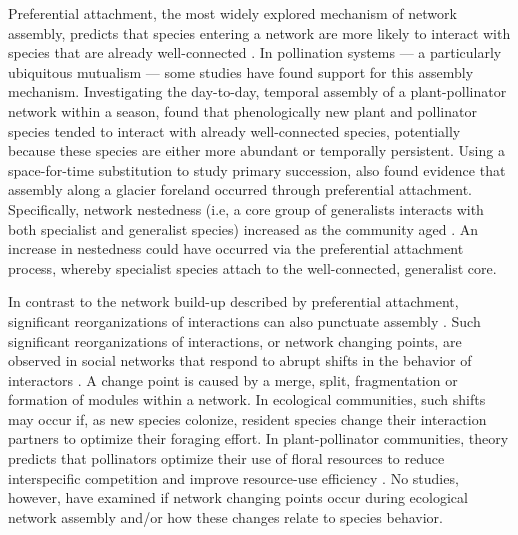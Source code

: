 \documentclass[12pt]{article}
\begin{document}

Preferential attachment, the most widely explored mechanism of network
assembly, predicts that species entering a network are more likely to
interact with species that are already well-connected \citep[the
``rich-get-richer'' principle,][]{barabasi1999emergence}. In
pollination systems --- a particularly ubiquitous mutualism
\citep{ollerton-2011-321, klein-2007-303} --- some studies have found
support for this assembly mechanism. Investigating the day-to-day,
temporal assembly of a plant-pollinator network within a season,
\cite{Olesen2008} found that phenologically new plant and pollinator
species tended to interact with already well-connected species,
potentially because these species are either more abundant or
temporally persistent. Using a space-for-time substitution to study
primary succession, \cite{albrecht2010plant} also found evidence that
assembly along a glacier foreland occurred through preferential
attachment. Specifically, network nestedness (i.e, a core group of
generalists interacts with both specialist and generalist species)
increased as the community aged \citep{albrecht2010plant}. An increase
in nestedness could have occurred via the preferential attachment
process, whereby specialist species attach to the well-connected,
generalist core.

In contrast to the network build-up described by preferential
attachment, significant reorganizations of interactions can also
punctuate assembly \citep{peel2014detecting}. Such significant
reorganizations of interactions, or network changing points, are
observed in social networks that respond to abrupt shifts in the
behavior of interactors \citep{peel2014detecting}. A change point is
caused by a merge, split, fragmentation or formation of modules within
a network. In ecological communities, such shifts may occur if, as new
species colonize, resident species change their interaction partners
to optimize their foraging effort. In plant-pollinator communities,
theory predicts that pollinators optimize their use of floral
resources to reduce interspecific competition and improve resource-use
efficiency \citep{pyke1984optimal, valdovinos2010consequences,
  valdovinos2013adaptive, albrecht2010plant, Bluthgen2007}. No
studies, however, have examined if network changing points occur
during ecological network assembly and/or how these changes relate to
species behavior.
\end{document}
